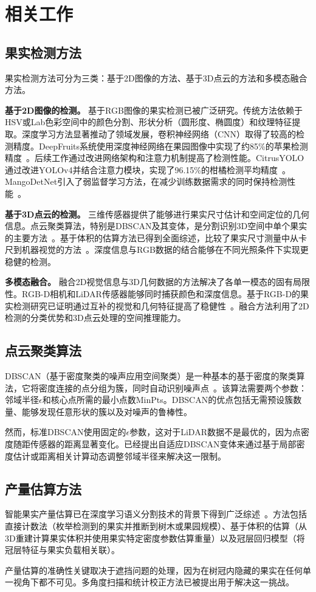 \section{相关工作}
\label{sec:related_work}

\subsection{果实检测方法}
果实检测方法可分为三类：基于2D图像的方法、基于3D点云的方法和多模态融合方法。

\textbf{基于2D图像的检测。} 基于RGB图像的果实检测已被广泛研究。传统方法依赖于HSV或Lab色彩空间中的颜色分割、形状分析（圆形度、椭圆度）和纹理特征提取。深度学习方法显著推动了领域发展，卷积神经网络（CNN）取得了较高的检测精度。DeepFruits系统使用深度神经网络在果园图像中实现了约85\%的苹果检测精度~\citep{Sa_2016}。后续工作通过改进网络架构和注意力机制提高了检测性能。CitrusYOLO通过改进YOLOv4并结合注意力模块，实现了96.15\%的柑橘检测平均精度~\citep{Chen_2022}。MangoDetNet引入了弱监督学习方法，在减少训练数据需求的同时保持检测性能~\citep{Denarda_2024}。

\textbf{基于3D点云的检测。} 三维传感器提供了能够进行果实尺寸估计和空间定位的几何信息。点云聚类算法，特别是DBSCAN及其变体，是分割识别3D空间中单个果实的主要方法~\citep{Ester_1996}。基于体积的估算方法已得到全面综述，比较了果实尺寸测量中从卡尺到机器视觉的方法~\citep{Neupane_2023}。深度信息与RGB数据的结合能够在不同光照条件下实现更稳健的检测。

\textbf{多模态融合。} 融合2D视觉信息与3D几何数据的方法解决了各单一模态的固有局限性。RGB-D相机和LiDAR传感器能够同时捕获颜色和深度信息。基于RGB-D的果实检测研究已证明通过互补的视觉和几何特征提高了稳健性~\citep{Tu_2020}。融合方法利用了2D检测的分类优势和3D点云处理的空间推理能力。

\subsection{点云聚类算法}
DBSCAN（基于密度聚类的噪声应用空间聚类）是一种基本的基于密度的聚类算法，它将密度连接的点分组为簇，同时自动识别噪声点~\citep{Ester_1996}。该算法需要两个参数：邻域半径$\epsilon$和核心点所需的最小点数MinPts。DBSCAN的优点包括无需预设簇数量、能够发现任意形状的簇以及对噪声的鲁棒性。

然而，标准DBSCAN使用固定的$\epsilon$参数，这对于LiDAR数据不是最优的，因为点密度随距传感器的距离显著变化。已经提出自适应DBSCAN变体来通过基于局部密度估计或距离相关计算动态调整邻域半径来解决这一限制。

\subsection{产量估算方法}
智能果实产量估算已在深度学习语义分割技术的背景下得到广泛综述~\citep{Maheswari_2021}。方法包括直接计数法（枚举检测到的果实并推断到树木或果园规模）、基于体积的估算（从3D重建计算果实体积并使用果实特定密度参数估算重量）以及冠层回归模型（将冠层特征与果实负载相关联）。

产量估算的准确性关键取决于遮挡问题的处理，因为在树冠内隐藏的果实在任何单一视角下都不可见。多角度扫描和统计校正方法已被提出用于解决这一挑战。